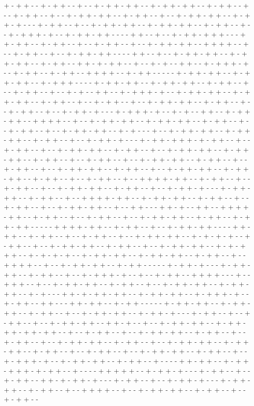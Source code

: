 + - + + - - + - + + - - + - - + - + + - + + - - + - + + - + + - - + - + + - - + - - + - + + - - + - - + - + + - + + - - + - + + - - + - - + - + + - + + - - + - + + - + - - - + - + + - - + - - + - + + - + + - - + - + + - + + - - + - + + - - + - - + - + + + - + - - + - + + - + + - - - - + + - - + - - + - + + - + + + - - - + + - + + - - + - + + - - + - - + - + + - - + - - + - + + - + + - - + + + + - - + - - + - + + - - + - - + - + + - + + - - - - + + - - + - - + - + + - + + - - + - + + - + + - - + - + + - - + + - + - + + - - + - - + - + - - + + - - + - + + + - + - - + - + + - - + - + + - - + + + + - - + - + + - - - - - + - + + - + + - - + - + + - + + - - + - + + + - - - - + - + + - + + - - + - + + - + + - - + - + + - - + - - + - + + - - + - - + - + - - + + - - + - + + + - + - - + - + + - + + - - + - + + - + + - - + - + + - - + - - + - + + - - + - - + - + + - + + - - + - + + - - + - - + - + + - - + - - + - + + - + - - - + - + + + - + - - + - + - - + + - - + - + + - + + - - + + + + - - + - - + - + + - + + - - + - + + - + + - - + - + + - - + - - + - + + - - + - - + - + + - + + - - + - + - - - + - - + - + + - + + - - + - + + - + + - - + - + + - - + - - + - + + - + - - - + - + + - + + + - + - + + - - + - - + - + + - - + - - + - + + - + + - - + - + + - - + - - + - + + - + + - - + - + + - + + - - + - + + - - + - - + - + + - - + - - + - + + - + + - - + - + + - - + - - + - + + - - + - - + - + + - + + - - + - + + - - + - - + - + + - + + - - + - + + - + + - - + - + + - - + - - + - + + - - + - - + + + + - + + - - + - + + - - + - - + - + + - - + - - + - + + - + + - - + - + + - - + - - + - + + - + - - - + - + + - + + - - + - + + - - + - - + + + + - + + - - + - + + - + + - - + - + + - - + - - + - + + - - + - - + - + + - + + - - + - - + + - - - + + - + - - + + - - + + + + - + + - - + - + + - - + - - + - + + - - + - - + - + + - + + - - + - + + - - + - + + - + + - - - - - + + + + - + + - - + - + + - - + - - + - + + - + + - - - - + + - + + - - + - + + - - + - - + - + + - - + - - + - + + - + + - - + - + - + - + - - + - + + - - + - - + - + + - + + - - + - + + - - + - - + - + + - + + - - + - + - + + + - - + - + - + - + - - + - + + - + + - - + - + + - + + - - + - + + - - + - - + + + + - - + - - + - + + - + + - - + - + + - - - - - + - + + - + - - - + - + + - + + - - + - + + - - + - - + - + + + - + - - + - - + - + + - - + + + + - - - + - - + + + - - + - - + - + + - + + - - + - + + - - + - - + - + + - + + - - + - + + - + + - - + - + - - - + + - + - + + - + + - - + - + + - + + - - + - + + + - + - - + - + + - - + + - - - + + - + + - - + - + + - - - - - + - + + - + + - - + - + + - + + - - + - + + - - + - - + - + + - + + - - + - + + - + - - - + - + + - - + - - + - + + - - + - - + - + + - + + - - + + - + - - + - - + - + + - + + - - + - + + - + + - + + - + + - - + - - + - + + - - + - - + - + + - + + - - + - + + - - + - - + - + + - - + - - + - + + - + + - - + - + + - - + - - + - + + - + + - - + - + + - + + - - + - + + - - + - - + - + + - - + - - + - + + - + + - - + - + + - - + - - + - + + + - + - - + - + + - + + - - + - + + - - + - - - - + + - + + - - + - + + - + + + - + - + + - - + - - - - + + + + + - - + - + + - + - - - + - + + - - + - - + - + + - - + + - + - + + - + - - - + - + + - - + - - + - + + - + - - - + - + + - + + - - + - + + - - + - - + + + + - - + - - + - + + - + + - - + - + + - - + - - + - + + - - 